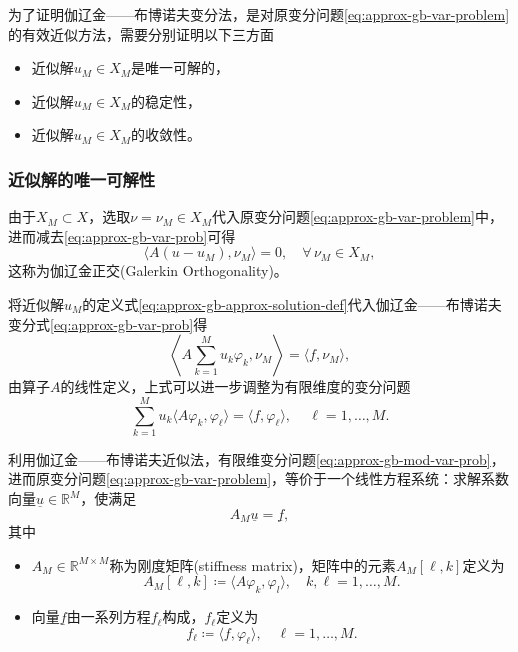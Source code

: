 为了证明伽辽金——布博诺夫变分法，是对原变分问题\eqref{eq:approx-gb-var-problem}的有效近似方法，需要分别证明以下三方面
\begin{itemize}%
  \item 近似解$u_{M} \in X_{M}$是唯一可解的，
  \item 近似解$u_{M} \in X_{M}$的稳定性，
  \item 近似解$u_{M} \in X_{M}$的收敛性。
\end{itemize}

\subsubsection{近似解的唯一可解性}
\label{sec:approx-gb-uniq-solvability}
由于$X_{M} \subset X$，选取$\nu = \nu_{M} \in X_{M}$代入原变分问题\eqref{eq:approx-gb-var-problem}中，进而减去\eqref{eq:approx-gb-var-prob}可得
\begin{equation}
  \label{eq:approx-gb-galerkin-orthogonality}
  \langle A \left( u - u_{M} \right) , \nu_{M} \rangle = 0, \quad \forall \, \nu_{M} \in X_{M},
\end{equation}
这称为伽辽金正交(Galerkin Orthogonality)。

将近似解$u_{M}$的定义式\eqref{eq:approx-gb-approx-solution-def}代入伽辽金——布博诺夫变分式\eqref{eq:approx-gb-var-prob}得
\begin{equation*}
  \left\langle
  A \sum_{k=1}^{M} u_{k} \varphi_{k}, \nu_{M} \right \rangle = \langle f, \nu_{M} \rangle,
\end{equation*}
由算子$A$的线性定义，上式可以进一步调整为有限维度的变分问题
\begin{equation}
  \label{eq:approx-gb-mod-var-prob}
  \sum_{k=1}^{M} u_{k} \langle A \varphi_{k}, \varphi_{\ell} \rangle
  = \langle f, \varphi_{\ell} \rangle, \quad \, \ell = 1,\ldots,M.
\end{equation}

利用伽辽金——布博诺夫近似法，有限维变分问题\eqref{eq:approx-gb-mod-var-prob}，进而原变分问题\eqref{eq:approx-gb-var-problem}，等价于一个线性方程系统：求解系数向量$\underline{u} \in \mathbb{R}^{M}$，使满足
\begin{equation}
  \label{eq:approx-gb-mod-var-prob-finite-dimen}
  A_{M} \underline{u} = \underline{f},
\end{equation}
其中
\begin{itemize}
  \item $A_{M} \in \mathbb{R}^{M \times M}$称为刚度矩阵(stiffness matrix)，矩阵中的元素$A_{M} \left[ \ell, k \right]$定义为
  \begin{equation*}
    A_{M} \left[ \ell, k \right] \coloneqq \langle A \varphi_{k}, \varphi_{l} \rangle, \quad k,\ell = 1, \ldots, M.
  \end{equation*}
  \item 向量$\underline{f}$由一系列方程$f_{\ell}$构成，$f_{\ell}$定义为
  \begin{equation*}
  f_{\ell} \coloneqq \langle f, \varphi_{\ell} \rangle, \quad \ell = 1, \ldots, M.
  \end{equation*}
\end{itemize}


